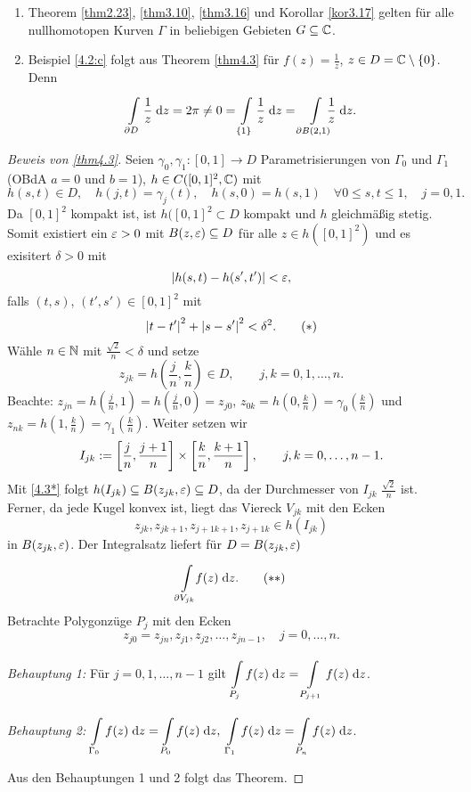 \documentclass[a4paper,twoside,DIV15,BCOR12mm]{scrbook}
\begin{document}
\begin{bem}\label{bem4.4}\begin{enumerate}
\item Theorem \ref{thm2.23}, \ref{thm3.10}, \ref{thm3.16} und Korollar \ref{kor3.17} gelten für alle nullhomotopen Kurven $\Gamma$ in beliebigen Gebieten $G\subseteq\mathbb{C}$.
\item Beispiel \ref{4.2:c} folgt aus Theorem \ref{thm4.3} für $f(z) = \frac{1}{z}$, $z\in D=\mathbb{C}\setminus\{0\}$. Denn
\[\int\limits_{\partial D}^{}{\frac{1}{z}}\;\mathrm{d}z = 2\pi\neq 0 = \int\limits_{\{1\}}^{}{\frac{1}{z}}\;\mathrm{d}z = \int\limits_{\partial B(2,1)}^{}{\!\!\!\!\frac{1}{z}}\;\mathrm{d}z.\]
\end{enumerate}
\end{bem}

\begin{proof}[Beweis von \ref{thm4.3}]
Seien $\gamma_0,\gamma_1\colon[0,1]\to D$ Parametrisierungen von $\Gamma_0$ und $\Gamma_1$ (OBdA $a=0$ und $b=1$), $h\in C([0,1]^2,\mathbb{C})$ mit 
\[h(s,t)\in D,\quad h(j,t)=\gamma_j(t),\quad h(s,0) = h(s,1)\quad\forall 0\leq s,t\leq 1,\quad j=0,1.\]
Da $[0,1]^2$ kompakt ist, ist $h([0,1]^2\subset D$ kompakt und $h$ gleichmäßig stetig. Somit existiert ein $\varepsilon>0$ mit $B(z,\varepsilon)\subseteq D$ für alle $z\in h([0,1]^2)$ und es exisitert $\delta>0$ mit
\[\left\lvert h(s,t)-h(s',t')\right\lvert<\varepsilon,\]
falls $(t,s)$, $(t',s')\in[0,1]^2$ mit
\[\label{4.3*}\left\lvert t-t'\right\lvert^2+\left\lvert s-s'\right\lvert^2<\delta^2.\tag{$*$}\]
Wähle $n\in\mathbb{N}$ mit $\frac{\sqrt{2}}{n}<\delta$ und setze
\[z_{jk} = h\left(\frac{j}{n},\frac{k}{n}\right)\in D,\qquad j,k=0,1,\dotsc,n.\]
Beachte: $z_{jn} = h(\frac{j}{n},1) = h(\frac{j}{n},0) = z_{j0}$, $z_{0k}=h(0,\frac{k}{n})=\gamma_0(\frac{k}{n})$ und $z_{nk} = h(1,\frac{k}{n})=\gamma_1(\frac{k}{n})$. Weiter setzen wir
\[I_{jk}:=\left[\frac{j}{n},\frac{j+1}{n}\right]\times\left[\frac{k}{n},\frac{k+1}{n}\right],\qquad j,k=0,\dotsc,n-1.\]
Mit \eqref{4.3*} folgt $h(I_{jk})\subseteq B(z_{jk},\varepsilon)\subseteq D$, da der Durchmesser von $I_{jk}$ $\frac{\sqrt{2}}{n}$ ist. Ferner, da jede Kugel konvex ist, liegt das Viereck $V_{jk}$ mit den Ecken
\[z_{jk},z_{jk+1},z_{j+1k+1},z_{j+1k}\in h(I_{jk})\]
in $B(z_{jk},\varepsilon)$. Der Integralsatz liefert für $D=B(z_{jk},\varepsilon)$
\[\label{4.3**}\int\limits_{\partial V_{jk}}^{}{\!\!f(z)}\;\mathrm{d}z.\tag{$**$}\]
Betrachte Polygonzüge $P_j$ mit den Ecken
\[z_{j0}=z_{jn},z_{j1},z_{j2},\dotsc,z_{jn-1},\quad j=0,\dotsc,n.\]

\textit{Behauptung 1:} Für $j=0,1,\dotsc,n-1$ gilt $\displaystyle\int\limits_{P_j}^{}{f(z)}\;\mathrm{d}z = \int\limits_{P_{j+1}}^{}{f(z)}\;\mathrm{d}z$.

\textit{Behauptung 2:} $\displaystyle\Integral{\Gamma_0}{}{f(z)}{z}=\Integral{P_0}{}{f(z)}{z},\ \Integral{\Gamma_1}{}{f(z)}{z}=\Integral{P_n}{}{f(z)}{z}$.


Aus den Behauptungen 1 und 2 folgt das Theorem.
\end{proof}
\end{document}
